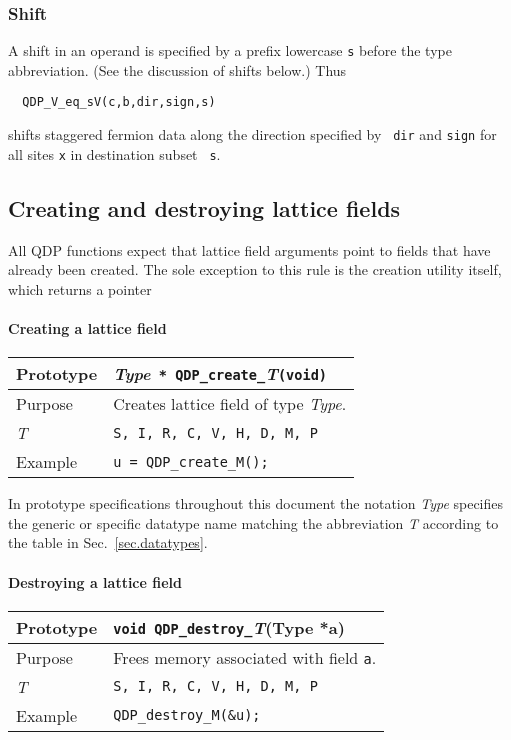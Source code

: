 \documentclass{article}
\newcommand{\allTypes}{{\tt S, I, R, C, V, H, D, M, P}}
\newcommand{\itt}{\it T}
\begin{document}
\subsubsection{Shift}

A shift in an operand is specified by a prefix lowercase {\tt s} before
the type abbreviation.  (See the discussion of shifts below.) Thus
%
\begin{verbatim}
  QDP_V_eq_sV(c,b,dir,sign,s)
\end{verbatim}
%
shifts staggered fermion data along the direction specified by {\tt
dir} and {\tt sign} for all sites {\tt x} in destination subset {\tt
s}.


\subsection{Creating and destroying lattice fields}

All QDP functions expect that lattice field arguments point to fields
that have already been created.  The sole exception to this rule is
the creation utility itself, which returns a pointer

\paragraph{Creating a lattice field}

\begin{flushleft}
  \begin{tabular}{|l|l|}
  \hline
  Prototype      & {\it Type}\verb| * QDP_create_|{\it T}\verb|(void)|\\
    \hline
  Purpose        & Creates lattice field of type {\it Type}.\\
    \hline
  \itt     & \allTypes \\
   \hline
  Example  & \verb|u = QDP_create_M();| \\
   \hline
 \end{tabular}
\end{flushleft}
In prototype specifications throughout this document the notation {\it
Type} specifies the generic or specific datatype name matching the
abbreviation {\it T} according to the table in
Sec.~\ref{sec.datatypes}.

\paragraph{Destroying a lattice field}

\begin{flushleft}
  \begin{tabular}{|l|l|}
  \hline
  Prototype      & \verb|void QDP_destroy_|{\it T}(Type *a)\\
    \hline
 Purpose        & Frees memory associated with field \verb|a|.\\
    \hline
 \itt     & \allTypes \\
   \hline
Example  & \verb|QDP_destroy_M(&u);| \\
   \hline
  \end{tabular}
\end{flushleft}
\end{document}
